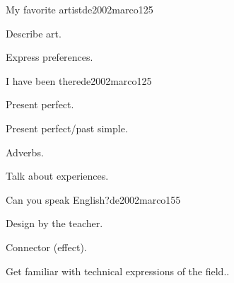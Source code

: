 \begin{syllabus}
\begin{unit}{My favorite artist}{}{de2002marco}{12}{5}
   \begin{learningoutcomes}
      \item Describe art.
      \item Express preferences.
   \end{learningoutcomes}

\end{unit}

\begin{unit}{I have been there}{}{de2002marco}{12}{5}
   \begin{topics}
      \item Present perfect.
      \item Present perfect/past simple.
      \item Adverbs.
   \end{topics}

   \begin{learningoutcomes}
      \item Talk about experiences.
   \end{learningoutcomes}

\end{unit}

\begin{unit}{Can you speak English?}{}{de2002marco}{15}{5}
   \begin{topics}
      \item Design by the teacher.
      \item Connector (effect).
   \end{topics}

   \begin{learningoutcomes}
      \item Get familiar with technical expressions of the field..
   \end{learningoutcomes}
\end{unit}

\begin{coursebibliography}
\end{coursebibliography}

\end{syllabus}
